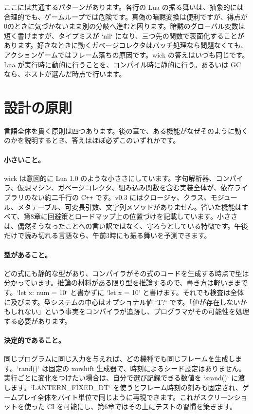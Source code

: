 ここには共通するパターンがあります。各行の Lua の振る舞いは、抽象的には合理的でも、ゲームループでは危険です。真偽の暗黙変換は便利ですが、得点が0のときに気づかないまま別の分岐へ進むと困ります。暗黙のグローバル変数は短く書けますが、タイプミスが `nil` になり、三つ先の関数で表面化することがあります。好きなときに動くガベージコレクタはバッチ処理なら問題なくても、アクションゲームではフレーム落ちの原因です。wick の答えはいつも同じです。Lua が実行時に動的に行うことを、コンパイル時に静的に行う。あるいは GC なら、ホストが選んだ時点で行います。

\section{設計の原則}

言語全体を貫く原則は四つあります。後の章で、ある機能がなぜそのように動くのかを説明するとき、答えはほぼ必ずこのいずれかです。

\paragraph{小さいこと。} wick は意図的に Lua 1.0 のような小ささにしています。字句解析器、コンパイラ、仮想マシン、ガベージコレクタ、組み込み関数を含む実装全体が、依存ライブラリのない約二千行の \mbox{C\texttt{++}} です。v0.3 にはクロージャ、クラス、モジュール、メタテーブル、可変長引数、文字列メソッドがありません。省いた機能はすべて、第8章に回避策とロードマップ上の位置づけを記載しています。小ささは、偶然そうなったことへの言い訳ではなく、守ろうとしている特徴です。午後だけで読み切れる言語なら、午前3時にも振る舞いを予測できます。

\paragraph{型があること。} どの式にも静的な型があり、コンパイラがその式のコードを生成する時点で型は分かっています。推論の材料がある限り型を推論するので、書き方は軽いままです。`let x: num = 10` と書かずに `let x = 10` と書けます。それでも検査は全体に及びます。型システムの中心はオプショナル値 `T?` です。「値が存在しないかもしれない」という事実をコンパイラが追跡し、プログラマがその可能性を処理する必要があります。

\paragraph{決定的であること。} 同じプログラムに同じ入力を与えれば、どの機種でも同じフレームを生成します。`rand()` は固定の xorshift 生成器で、時刻によるシード設定はありません。実行ごとに変化をつけたい場合は、自分で選び記録できる数値を `srand()` に渡します。`LANTERN_FIXED_DT` を使うとフレーム時刻の刻みも固定され、ゲームプレイ全体をバイト単位で同じように再現できます。これがスクリーンショットを使った CI を可能にし、第6章ではその上にテストの習慣を築きます。

